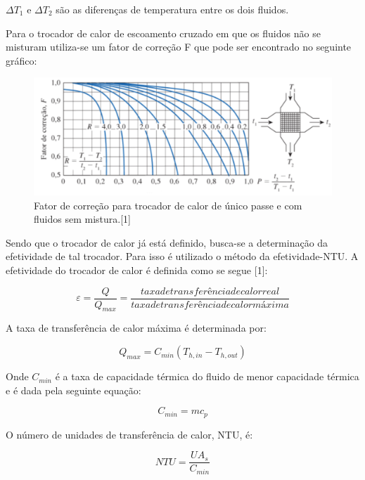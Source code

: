 $\Delta T_{1}$ e $\Delta T_{2}$ são as diferenças de temperatura entre os dois fluidos.

Para o trocador de calor de escoamento cruzado em que os fluidos não se misturam utiliza-se um fator de correção F que pode ser encontrado no seguinte gráfico:

\begin{figure}[h!]
	\centering
	\includegraphics[keepaspectratio=true,scale= 0.3]{figuras/fator-de-correcao.png}
	\caption{Fator de correção para trocador de calor de único passe e com fluidos sem mistura.[1]}
	\label{fator-de-correcao}
\end{figure}

Sendo que o trocador de calor já está definido, busca-se a determinação da efetividade de tal trocador. Para isso é utilizado o método da efetividade-NTU. A efetividade do trocador de calor é definida como se segue [1]:

\begin{equation}
	\varepsilon = \frac{Q}{Q_{max}} = \frac{taxa de transferência de calor real}{taxa de transferência de calor máxima}
\end{equation}

A taxa de transferência de calor máxima é determinada por:

\begin{equation}
	Q_{max} = C_{min} (T_{h, in} - T_{h, out})
\end{equation}

Onde $C_{min}$ é a taxa de capacidade térmica do fluido de menor capacidade térmica e é dada pela seguinte equação:

\begin{equation}
	C_{min} = mc_{p}
\end{equation}

O número de unidades de transferência de calor, NTU, é:

\begin{equation}
	NTU = \frac{UA_{s}}{C_{min}}
\end{equation}

